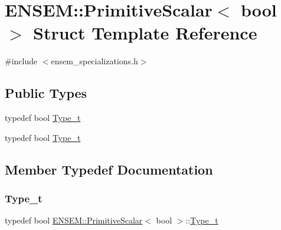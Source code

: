 \hypertarget{structENSEM_1_1PrimitiveScalar_3_01bool_01_4}{}\section{E\+N\+S\+EM\+:\+:Primitive\+Scalar$<$ bool $>$ Struct Template Reference}
\label{structENSEM_1_1PrimitiveScalar_3_01bool_01_4}


{\ttfamily \#include $<$ensem\+\_\+specializations.\+h$>$}

\subsection*{Public Types}
\begin{DoxyCompactItemize}
\item 
typedef bool \mbox{\hyperlink{structENSEM_1_1PrimitiveScalar_3_01bool_01_4_a3433ef77cf65b05846eddc474f588a73}{Type\+\_\+t}}
\item 
typedef bool \mbox{\hyperlink{structENSEM_1_1PrimitiveScalar_3_01bool_01_4_a3433ef77cf65b05846eddc474f588a73}{Type\+\_\+t}}
\end{DoxyCompactItemize}


\subsection{Member Typedef Documentation}
\mbox{\label{structENSEM_1_1PrimitiveScalar_3_01bool_01_4_a3433ef77cf65b05846eddc474f588a73}} 
\subsubsection{\texorpdfstring{Type\_t}{Type\_t}\hspace{0.1cm}{\footnotesize\ttfamily [1/2]}}
{\footnotesize\ttfamily typedef bool \mbox{\hyperlink{structENSEM_1_1PrimitiveScalar}{E\+N\+S\+E\+M\+::\+Primitive\+Scalar}}$<$ bool $>$\+::\mbox{\hyperlink{structENSEM_1_1PrimitiveScalar_3_01bool_01_4_a3433ef77cf65b05846eddc474f588a73}{Type\+\_\+t}}}

\mbox{\label{structENSEM_1_1PrimitiveScalar_3_01bool_01_4_a3433ef77cf65b05846eddc474f588a73}} 
